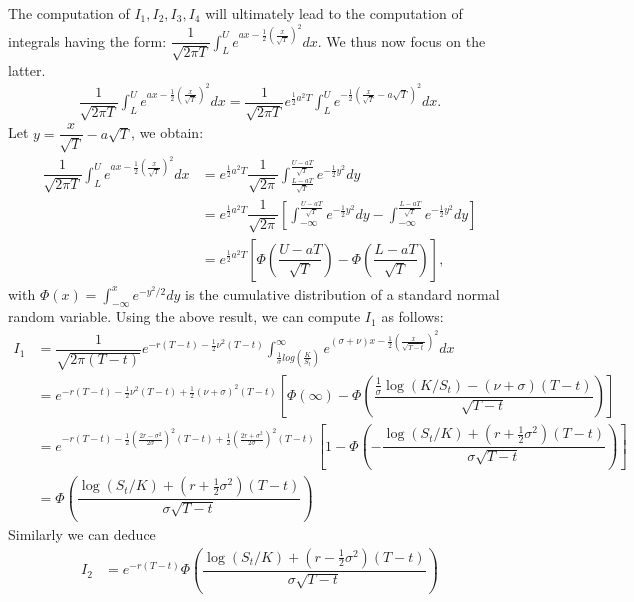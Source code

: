 \documentclass[12pt]{article}
\def\ds{\displaystyle}
\begin{document}
The computation of $I_1, I_2, I_3, I_4$ will ultimately lead to the computation of integrals having the form: 
$	\dfrac{1}{\sqrt{2\pi T}}\displaystyle \int_{L}^{U}e^{a x-\frac{1}{2}(\frac{ x}{\sqrt{T}})^2}d x$. We thus now focus on the latter.
\begin{align*}
	\dfrac{1}{\sqrt{2\pi T}}\displaystyle \int_{L}^{U}e^{a x-\frac{1}{2}(\frac{ x}{\sqrt{T}})^2}d x=\dfrac{1}{\sqrt{2\pi T}}e^{\frac{1}{2}a^2T}\displaystyle \int_{L}^{U}e^{-\frac{1}{2}\left(\frac{ x}{\sqrt{T}}-a\sqrt{T}\right)^2}d x.
\end{align*}
Let $y=\dfrac{ x}{\sqrt{T}}-a\sqrt{T}$, we obtain:
\begin{align*}
	\dfrac{1}{\sqrt{2\pi T}}\displaystyle \int_{L}^{U}e^{a x-\frac{1}{2}(\frac{ x}{\sqrt{T}})^2}d x
	&=e^{\frac{1}{2}a^2T}\dfrac{1}{\sqrt{2\pi }}\displaystyle \int_{\frac{L-aT}{\sqrt{T}}}^{\frac{U-aT}{\sqrt{T}}}e^{-\frac{1}{2}y^2}dy\\
	&=e^{\frac{1}{2}a^2T}\dfrac{1}{\sqrt{2\pi }}\left[\displaystyle \int_{-\infty}^{\frac{U-aT}{\sqrt{T}}}e^{-\frac{1}{2}y^2}dy-\displaystyle \int_{-\infty}^{\frac{L-aT}{\sqrt{T}}}e^{-\frac{1}{2}y^2}dy\right]\\
	&=e^{\frac{1}{2}a^2T}\left[\Phi\left(\dfrac{U-aT}{\sqrt{T}}\right)-\Phi\left(\dfrac{L-aT}{\sqrt{T}}\right)\right],
\end{align*}
with
 $\Phi(x)=\ds\int_{-\infty}^xe^{-y^2/2}dy$ is the cumulative distribution of a standard normal random variable.
Using the above result, we can compute $I_1$ as follows:
\begin{align*}
	I_1&=\dfrac{1}{\sqrt{2\pi (T-t)}}e^{-r(T-t)-\frac{1}{2}\nu^2(T-t)}\displaystyle \int_{\frac{1}{\sigma}log\left(\frac{K}{S_t}\right) }^{\infty}e^{(\sigma+ \nu) x-\frac{1}{2}\left(\frac{ x}{\sqrt{T-t}}\right)^2}d x\\
	&=e^{-r(T-t)-\frac{1}{2}\nu^2(T-t)+\frac{1}{2}(\nu+\sigma)^2(T-t)}\left[\Phi(\infty)-\Phi\left(\dfrac{\frac{1}{\sigma}\log(K/S_t)-(\nu +\sigma)(T-t)}{\sqrt{T-t}}\right)\right]\\
&=e^{-r(T-t)-\frac{1}{2}\left(\frac{2r-\sigma^2}{2\sigma}\right)^2(T-t)+\frac{1}{2}\left(\frac{2r+\sigma^2}{2\sigma}\right)^2(T-t)}\left[1-\Phi\left(-\dfrac{\log(S_t/K)+(r+\frac{1}{2}\sigma^2)(T-t)}{\sigma\sqrt{T-t}}\right)\right]\\
	&=\Phi \left(\dfrac{\log(S_t/K)+(r+\frac{1}{2}\sigma^2)(T-t)}{\sigma\sqrt{T-t}}\right)
\end{align*}
Similarly we can deduce
\begin{align*}
	I_2&=e^{-r(T-t)}\Phi \left(\dfrac{\log(S_t/K)+(r-\frac{1}{2}\sigma^2)(T-t)}{\sigma\sqrt{T-t}}\right)
	\end{align*}
\end{document}
